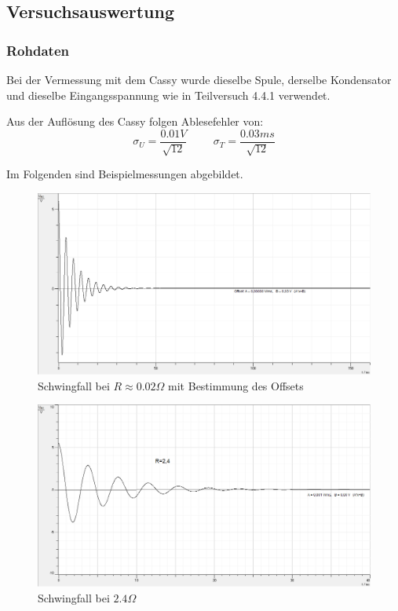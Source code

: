 \documentclass[12pt,a4paper]{article}
\begin{document}
\newpage
\subsection{Versuchsauswertung}

\subsubsection{Rohdaten}
Bei der Vermessung mit dem Cassy wurde dieselbe Spule, derselbe Kondensator und dieselbe Eingangsspannung wie in Teilversuch 4.4.1 verwendet.

Aus der Auflösung des Cassy folgen Ablesefehler von:
\begin{equation}
\sigma_U=\frac{0.01V}{\sqrt{12}} \hspace{1cm}
\sigma_T=\frac{0.03ms}{\sqrt{12}}
\end{equation}

Im Folgenden sind Beispielmessungen abgebildet.

\begin{figure}[H]
\caption{Schwingfall bei $R\approx 0.02\Omega$ mit Bestimmung des Offsets}
\centering
\includegraphics[scale=0.3]{Bilder/SchwingfallMitOffset0Ohm.png}
\end{figure}

\begin{figure}[H]
\caption{Schwingfall bei $2.4\Omega$}
\centering
\includegraphics[scale=0.3]{Bilder/Schwingfall2komma4Ohm.png}
\end{figure}
\end{document}
